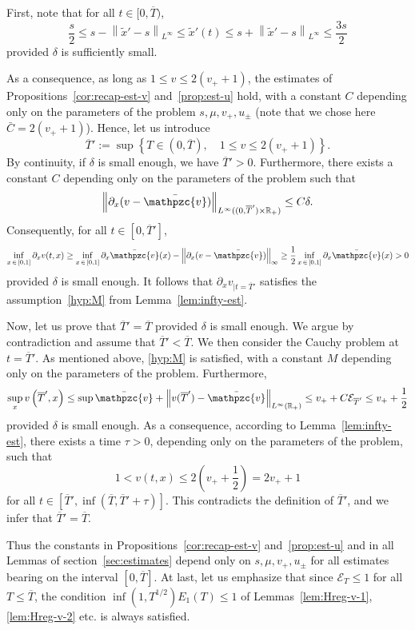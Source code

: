 \documentclass[AHL,Unicode,longabstracts,published]{cedram}
\newcommand{\R}{\mathbb{R}}
\newcommand{\p}{\partial}
\newcommand{\bv}{\bar{\mathpzc{v}}}
\newcommand{\cE}{\mathcal E}
\newcommand{\tx}{\widetilde{x}}
\newcommand{\tx}{\widetilde{x}}
\begin{document}
First, note that for all $t\in [0, \overline{T})$,
\begin{equation}\label{bound:tx'}
\frac s 2 \leq s - \left\|\tx'-s\right\|_{L^\infty}\leq \tx'(t)\leq s + \left\|\tx'-s\right\|_{L^\infty}\leq \frac{3s}{2}
\end{equation} provided $\delta$ is sufficiently small.

As a consequence, as long as $1\leq v\leq 2(v_++1)$, the estimates of Propositions~\ref{cor:recap-est-v} and~\ref{prop:est-u} hold, with a constant $C$ depending only on the parameters of the problem $s,\mu, v_+, u_\pm$ (note that we chose here $\bar C=2 (v_++1)$). Hence, let us introduce
\[
\overline{T}':=\sup \left\{ T\in (0, \overline{T}),\quad 1\leq v\leq 2(v_+ + 1) \right\}.
\]
By continuity, if $\delta$ is small enough, we have $\overline{T}'>0$. Furthermore, there exists a constant $C$ depending only on the parameters of the problem such that
\[
\left\|\p_x (v-\bv)\right\|_{L^\infty((0, \overline{T}')\times \R_+)}\leq C \delta.
\]
Consequently, for all $t\in [0, \overline{T}']$,
\[
\inf_{x\,\in\,[0,1]} \p_x v(t,x)\geq \inf_{x\,\in\,[0,1]} \p_x \bv(x) - \left\|\p_x (v-\bv)\right\|_\infty \geq \frac{1}{2}\inf_{x\,\in\,[0,1]} \p_x \bv(x)>0
\]
provided $\delta$ is small enough. It follows that $\p_x v_{|t=\overline{T}'}$ satisfies the assumption~\eqref{hyp:M} from Lemma~\ref{lem:infty-est}.

Now, let us prove that $\overline{T}'=\overline{T}$ provided $\delta$ is small enough. We argue by contradiction and assume that $\overline{T}'<\overline{T}$. We then consider the Cauchy problem at $t=\overline{T}'$. As mentioned above, \eqref{hyp:M} is satisfied, with a constant $M$ depending only on the parameters of the problem. Furthermore,
\[
\sup_x v\left(\overline{T}', x\right) \leq \sup \bv + \left\|v(\overline{T}')-\bv\right\|_{L^\infty(\R_+)}\leq v_+ + C\cE_{\overline{T}'} \leq v_+ + \frac{1}{2}
\]
provided $\delta$ is small enough. As a consequence, according to Lemma~\ref{lem:infty-est}, there exists a time $\tau>0$, depending only on the parameters of the problem, such that
\[
1<v(t,x)\leq 2\left(v_+ + \frac{1}{2}\right)=2 v_+ +1
\]
for all $t\in [\overline{T}', \inf(\overline{T}, \overline{T}' + \tau)]$. This contradicts the definition of $\overline{T}'$, and we infer that $\overline{T}'=\overline{T}$.



Thus the constants in Propositions~\ref{cor:recap-est-v} and~\ref{prop:est-u} and in all Lemmas of section~\ref{sec:estimates} depend only on $s,\mu, v_+, u_\pm$ for all estimates bearing on the interval $[0, \overline{T}]$. At last, let us emphasize that since $\cE_T\leq 1$ for all $T\leq \overline{T}$, the condition $\inf(1,T^{1/2}) E_1(T)\leq 1$ of Lemmas~\ref{lem:Hreg-v-1}, \ref{lem:Hreg-v-2} etc. is always satisfied.
\end{document}
